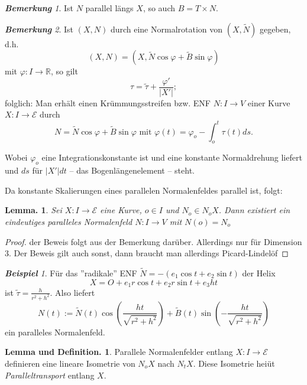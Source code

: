 \documentclass[a4paper,oneside,11pt,DIV=12,parskip=half]{scrartcl}
\newcommand{\R}{\mathbb R}
\newcommand{\E}{\mathcal E}
\theoremstyle{plain}
\newtheorem{lemma}[theorem]{Lemma.}
\theoremstyle{definition}
\newtheorem{remark, definition}[theorem]{Bemerkung und Definition.}
\newtheorem{lemma, definition}[theorem]{Lemma und Definition.}
\theoremstyle{remark}
\newtheorem*{remark}{\textbf{Bemerkung}}
\newtheorem*{example}{\textbf{Beispiel}}
\newtheorem*{remark, example}{\textbf{Bemerkung und Beispiel}}
\begin{document}
\begin{remark}
	Ist $N$ parallel längs $X$, so auch $B = T\times N.$
\end{remark}

\begin{remark}
	Ist $(X,N)$ durch eine Normalrotation von $(X, \widetilde{N})$ gegeben, d.h. \[ (X,N) = (X,\widetilde{N} \cos \varphi + \widetilde{B}\sin \varphi) \] mit $\varphi: I \rightarrow \R$, so gilt 
	\[ \tau = \widetilde{\tau} + \frac{\varphi '}{|X'|}; \]
	folglich: Man erhält einen Krümmungsstreifen bzw. ENF $N: I \rightarrow V$ einer Kurve $X: I \rightarrow \E$ durch \[ N = \widetilde{N} \cos \varphi + \widetilde{B} \sin \varphi \text{ mit } \varphi(t) = \varphi_o - \int_{o}^{t} \tau(t) ds. \]
	
	Wobei $\varphi_o$ eine Integrationskonstante ist und eine konstante Normaldrehung liefert und $ds$ für $|X'| dt$ -- das Bogenlängenelement -- steht.
	
	Da konstante Skalierungen eines parallelen Normalenfeldes parallel ist, folgt:
	
	
\end{remark}

\begin{lemma}
	Sei $X: I \rightarrow \E$ eine Kurve, $o \in I$ und $N_o \in N_oX$. Dann existiert ein eindeutiges paralleles Normalenfeld $N: I \rightarrow V$ mit $N(o) = N_o$
\end{lemma}

\begin{proof}
	der Beweis folgt aus der Bemerkung darüber. Allerdings nur für Dimension 3. Der Beweis gilt auch sonst, dann braucht man allerdings Picard-Lindelöf
\end{proof}

\begin{example}
	Für das ''radikale'' ENF $\widetilde{N} = - (e_1 \cos t + e_2 \sin t)$ der Helix
	$$ X = O + e_1 r \cos t + e_2 r \sin t + e_3 h t$$
	ist $\widetilde{\tau} = \frac{h}{r^2 + h^2}$. Also liefert \[ N(t) := \widetilde{N}(t) \cos (\frac{ht}{\sqrt{r^2 + h^2}}) + \widetilde{B}(t) \sin (-\frac{ht}{\sqrt{r^2 + h^2}}) \] ein paralleles Normalenfeld.

\end{example}

\begin{lemma, definition}
	Parallele Normalenfelder entlang $X: I \rightarrow \E$ definieren eine lineare Isometrie von $N_oX$ nach $N_tX$. Diese Isometrie heiüt \emph{Paralleltransport} entlang $X$.
\end{lemma, definition}
\end{document}

